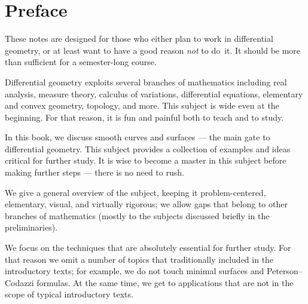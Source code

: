 \null\vfill{}


\thispagestyle{empty}
\newpage
{\sloppy
\tableofcontents

\tableofcontents

\newpage
\section*{Preface}

These notes are designed for those who either plan to work in differential geometry,
or at least want to have a good reason \emph{not} to do~it.
It should be more than sufficient for a semester-long course. 

Differential geometry exploits several branches of mathematics including 
real analysis, 
measure theory,
calculus of variations,
differential equations,
elementary and convex geometry,
topology, and more.
This subject is wide even at the beginning. 
For that reason, it is fun and painful both to teach and to study.

In this book, we discuss smooth curves and surfaces --- the main gate to differential geometry.
This subject provides a collection of examples and ideas critical for further study.
It is wise to become a master in this subject before making further steps --- there is no need to rush.

We give a general overview of the subject, keeping it
problem-centered,
elementary, 
visual, 
and virtually rigorous; we allow gaps that belong to other branches of mathematics (mostly to the subjects discussed briefly in the preliminaries).

We focus on the techniques that are absolutely essential for further study.
For  that reason we omit a number of topics that traditionally included in the introductory texts;
for example, we do not touch %
minimal surfaces and Peterson--Codazzi formulas.
At the same time, we get to applications
 that are not in the scope of typical introductory texts.
 
}

